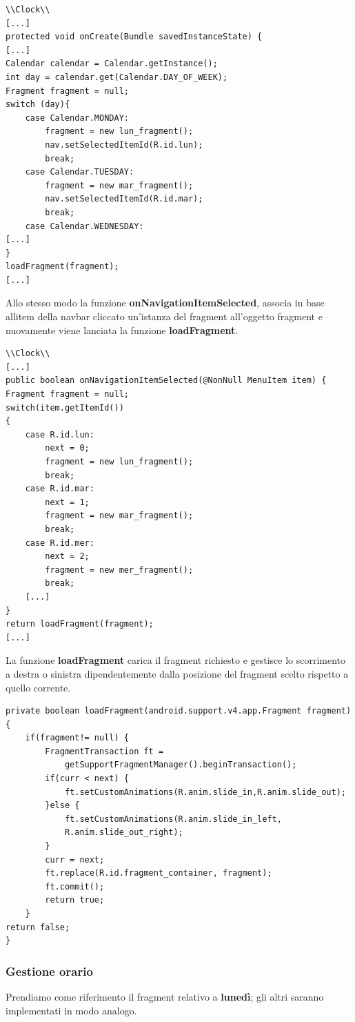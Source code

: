 \documentclass[a4paper, 50pt, twoside]{article}
\begin{document}
\begin{lstlisting}
\\Clock\\
[...]
protected void onCreate(Bundle savedInstanceState) {
[...]
Calendar calendar = Calendar.getInstance();
int day = calendar.get(Calendar.DAY_OF_WEEK);
Fragment fragment = null;
switch (day){
	case Calendar.MONDAY:
		fragment = new lun_fragment();
		nav.setSelectedItemId(R.id.lun);
		break;
	case Calendar.TUESDAY:
		fragment = new mar_fragment();
		nav.setSelectedItemId(R.id.mar);
		break;
	case Calendar.WEDNESDAY:
[...]
}
loadFragment(fragment);
[...]
\end{lstlisting}

Allo stesso modo la funzione \textbf{onNavigationItemSelected}, associa in base allitem della navbar cliccato un'istanza del fragment all'oggetto fragment e nuovamente viene lanciata la funzione \textbf{loadFragment}.

\begin{lstlisting}
\\Clock\\
[...]
public boolean onNavigationItemSelected(@NonNull MenuItem item) {
Fragment fragment = null;
switch(item.getItemId())
{
	case R.id.lun:
		next = 0;
		fragment = new lun_fragment();
		break;
	case R.id.mar:
		next = 1;
		fragment = new mar_fragment();
		break;
	case R.id.mer:
		next = 2;
		fragment = new mer_fragment();
		break;
	[...]
}
return loadFragment(fragment);
[...]
\end{lstlisting}

La funzione \textbf{loadFragment} carica il fragment richiesto e gestisce lo scorrimento a destra o sinistra dipendentemente dalla posizione del fragment scelto rispetto a quello corrente.
\begin{lstlisting}
private boolean loadFragment(android.support.v4.app.Fragment fragment) {
	if(fragment!= null) {
		FragmentTransaction ft = 
			getSupportFragmentManager().beginTransaction();
		if(curr < next) {
			ft.setCustomAnimations(R.anim.slide_in,R.anim.slide_out);
		}else {
			ft.setCustomAnimations(R.anim.slide_in_left,
			R.anim.slide_out_right);
		}
		curr = next;
		ft.replace(R.id.fragment_container, fragment);
		ft.commit();
		return true;
	}
return false;
}
\end{lstlisting}
\subsubsection{Gestione orario}
Prendiamo come riferimento il fragment relativo a \textbf{lunedì}; gli altri saranno implementati in modo analogo.
\end{document}
